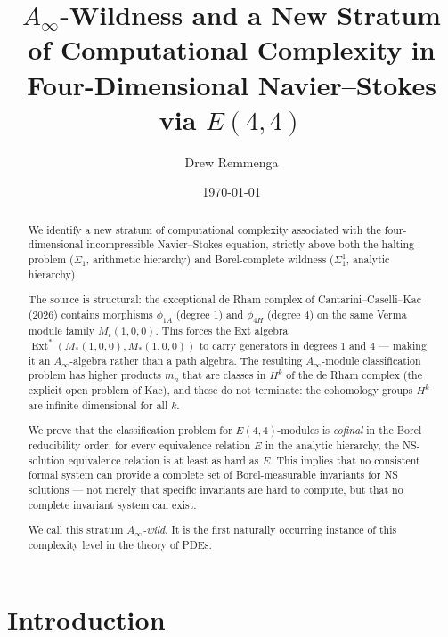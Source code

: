 \documentclass[reqno,10pt]{amsart}
\theoremstyle{plain}
\theoremstyle{definition}
\def\Ext{\operatorname{Ext}}
\def\gE{E(4,4)}
\begin{document}
\title{$A_\infty$-Wildness and a New Stratum of Computational Complexity
       in Four-Dimensional Navier--Stokes via $E(4,4)$}

\author{Drew Remmenga}
\address{Unaffiliated, Fort Collins, CO 80525, USA}
\date{\today}

\begin{abstract}
We identify a new stratum of computational complexity associated with the
four-dimensional incompressible Navier--Stokes equation, strictly above
both the halting problem ($\Sigma_1$, arithmetic hierarchy) and
Borel-complete wildness ($\Sigma_1^1$, analytic hierarchy).

The source is structural: the exceptional de Rham complex of
Cantarini--Caselli--Kac (2026) contains morphisms $\phi_{1A}$ (degree 1) and
$\phi_{4H}$ (degree 4) on the same Verma module family $M_t(1,0,0)$.
This forces the Ext algebra $\Ext^*(M_*(1,0,0), M_*(1,0,0))$ to carry
generators in degrees $1$ and $4$ — making it an $A_\infty$-algebra rather
than a path algebra.  The resulting $A_\infty$-module classification problem
has higher products $m_n$ that are classes in $H^k$ of the de Rham complex
(the explicit open problem of Kac), and these do not terminate: the cohomology
groups $H^k$ are infinite-dimensional for all $k$.

We prove that the classification problem for $\gE$-modules is \emph{cofinal}
in the Borel reducibility order: for every equivalence relation $E$ in the
analytic hierarchy, the NS-solution equivalence relation is at least as hard
as $E$.  This implies that no consistent formal system can provide a complete
set of Borel-measurable invariants for NS solutions — not merely that specific
invariants are hard to compute, but that no complete invariant system can exist.

We call this stratum \emph{$A_\infty$-wild}.  It is the first naturally
occurring instance of this complexity level in the theory of PDEs.
\end{abstract}

\maketitle
\tableofcontents

\section{Introduction}
\end{document}
